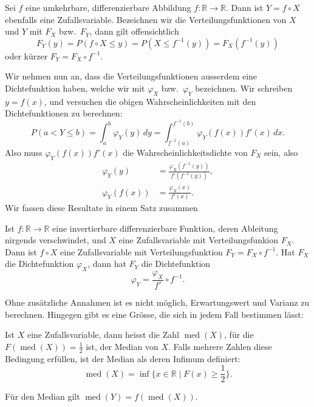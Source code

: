 Sei $f$ eine umkehrbare, differenzierbare Abbildung
$f\colon\mathbb{R}\to\mathbb{R}$.
Dann ist $Y=f\circ X$ ebenfalls eine
Zufallsvariable.
Bezeichnen wir die Verteilungsfunktionen von $X$ und $Y$
mit $F_X$ bzw.~$F_Y$, dann gilt offensichtlich
\[
F_Y(y)=P(f\circ X\le y)=P(X\le f^{-1}(y))=F_X(f^{-1}(y))
\]
oder kürzer $F_Y=F_X\circ f^{-1}$.

Wir nehmen nun an, dass die Verteilungsfunktionen ausserdem eine
Dichtefunktion haben, welche wir mit $\varphi_X$ bzw.~$\varphi_Y$
bezeichnen.
Wir schreiben $y=f(x)$, und versuchen die obigen
Wahrscheinlichkeiten mit den Dichtefunktionen zu berechnen:
\[
P(a<Y\le b)
=\int_a^b\varphi_Y(y)\,dy
=\int_{f^{-1}(a)}^{f^{-1}(b)}\varphi_Y(f(x)) f'(x)\,dx.
\]
Also muss $\varphi_Y(f(x))f'(x)$ die Wahrscheinlichkeitsdichte von
$F_X$ sein, also 
\begin{align*}
\varphi_Y(y)&=\frac{\varphi_X(f^{-1}(y))}{f'(f^{-1}(y))},\\
\varphi_Y(f(x))&=\frac{\varphi_X(x)}{f'(x)}.
\end{align*}
Wir fassen diese Resultate in einem Satz zusammen

\begin{satz}
\label{satz-variablentransformation}
Ist $f\colon\mathbb{R}\to\mathbb{R}$ eine invertierbare
differenzierbare Funktion, deren Ableitung nirgends verschwindet,
und $X$ eine Zufallsvariable mit Verteilungsfunkion $F_X$.
Dann ist
$f\circ X$ eine Zufallsvariable mit Verteilungsfunktion
$F_Y=F_X\circ f^{-1}$.
Hat $F_X$ die Dichtefunktion $\varphi_X$, dann
hat $F_Y$ die Dichtefunktion
\[
\varphi_Y=\frac{\varphi_X}{f'}\circ f^{-1}.
\]
\end{satz}

Ohne zusätzliche Annahmen ist es nicht möglich, Erwartungswert und
Varianz zu berechnen.
Hingegen gibt es eine Grösse, die sich in jedem
Fall bestimmen lässt:
\begin{definition}
Ist $X$ eine Zufallsvariable, dann heisst die Zahl $\operatorname{med}(X)$,
für die
$F(\operatorname{med}(X))=\frac12$ ist, der Median von $X$. 
Falls mehrere Zahlen diese Bedingung erfüllen, ist der Median als
deren Infimum definiert:
\[
\operatorname{med}(X)=\inf \{x\in\mathbb{R}\;|\;F(x)\ge{\textstyle \frac12}\}.
\]
\end{definition}
Für den Median gilt $\operatorname{med}(Y)=f(\operatorname{med}(X))$.

